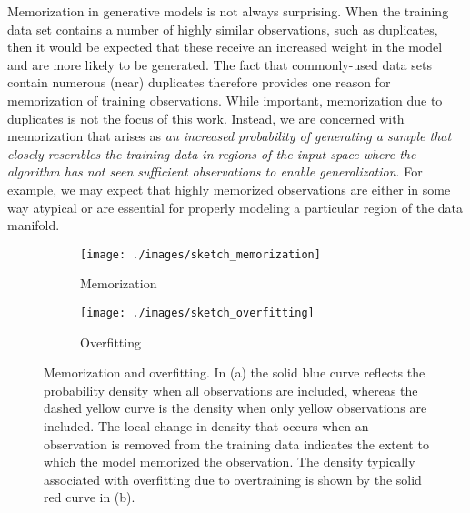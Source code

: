 \documentclass{article}
\begin{document}
Memorization in generative models is not always surprising. When the training 
data set contains a number of highly similar observations, such as duplicates, 
then it would be expected that these receive an increased weight in the model 
and are more likely to be generated. The fact that commonly-used data sets 
contain numerous (near) duplicates \cite{barz2020do} therefore provides one 
reason for memorization of training observations. While important, 
memorization due to duplicates is not the focus of this work.  Instead, we are 
concerned with memorization that arises as \emph{an increased probability of 
	generating a sample that closely resembles the training data in 
	regions of the input space where the algorithm has not seen sufficient 
	observations to enable generalization}. For example, we may expect 
that highly memorized observations are either in some way atypical or are 
essential for properly modeling a particular region of the data manifold.

\begin{figure}[tb]
	\centering
	\captionsetup[subfigure]{justification=centering}%
	\begin{subfigure}[b]{.40\textwidth}
		\centering
		\texttt{[image: ./images/sketch\_memorization]}
		\caption{Memorization \label{fig:sketch_mem}}
	\end{subfigure}
	\qquad
	\begin{subfigure}[b]{.40\textwidth}
		\centering
		\texttt{[image: ./images/sketch\_overfitting]}
		\caption{Overfitting \label{fig:sketch_over}}
	\end{subfigure}
	\caption{Memorization and overfitting. In (a) the solid 
		\textcolor{MyBlue}{blue} curve reflects the probability 
		density when all observations are included, whereas the dashed   
		\textcolor{MyYellow}{yellow} curve is the density when only 
		yellow observations are included. The local change in density 
		that occurs when an observation is removed from the training 
		data indicates the extent to which the model memorized the 
		observation. The density typically associated with overfitting 
		due to overtraining is shown by the solid 
		\textcolor{MyRed}{red} curve in (b).\label{fig:illustration}}%
\end{figure}
\end{document}
